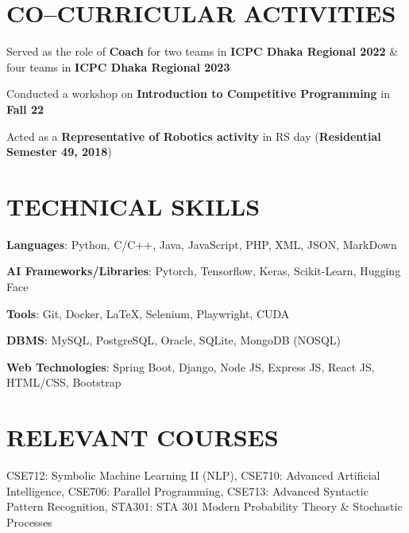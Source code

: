 \documentclass[letterpaper,10.5pt]{article}
\begin{document}
\newpage
\section{CO--CURRICULAR ACTIVITIES}

\begin{itemize}[leftmargin=0.2in, label={}, parsep=-3pt]
  \small{
  \item [\ding{109}]{
        Served as the role of \textbf{Coach} for two teams in \textbf{ICPC Dhaka Regional 2022} \& four teams in \textbf{ICPC Dhaka Regional 2023}} \\
  \item [\ding{109}]{Conducted a workshop on \textbf{Introduction to Competitive Programming} in \textbf{Fall 22}}
  \item [\ding{109}]{Acted as a \textbf{Representative of Robotics activity} in RS day (\textbf{Residential Semester 49, 2018})}
        }
\end{itemize}
\vspace{-16pt}


\section{TECHNICAL SKILLS}
\vspace{-0.5pt}
\begin{itemize}[leftmargin=0in, label={}, parsep=-2pt]
  \small{\item{
                \textbf{Languages}{: Python, C/C++, Java, JavaScript, PHP, XML, JSON, MarkDown}}
    \item{\textbf{AI Frameworks/Libraries}{: Pytorch, Tensorflow, Keras, Scikit-Learn, Hugging Face}}
    \item{\textbf{Tools}{: Git, Docker, \LaTeX, Selenium, Playwright, CUDA}}
    \item{\textbf{DBMS}{: MySQL, PostgreSQL, Oracle, SQLite, MongoDB (NOSQL)}}
    \item{\textbf{Web Technologies}{: Spring Boot, Django, Node JS, Express JS, React JS, HTML/CSS, Bootstrap}}
  }
\end{itemize}
\vspace{-16pt}

\section{RELEVANT COURSES}
CSE712: Symbolic Machine Learning II (NLP),
CSE710: Advanced Artificial Intelligence,
CSE706: Parallel Programming,
CSE713: Advanced Syntactic Pattern Recognition,
STA301: STA 301 Modern Probability Theory \& Stochastic Processes
\end{document}
